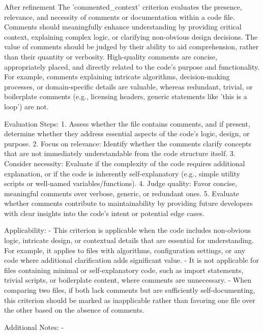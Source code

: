 \begin{tcolorbox}
    [title = {Criterion \textbf{commented\_context}},breakable] After refinement
    \tcblower \footnotesize The 'commented\_context' criterion evaluates the presence,
    relevance, and necessity of comments or documentation within a code file.
    Comments should meaningfully enhance understanding by providing critical
    context, explaining complex logic, or clarifying non-obvious design
    decisions. The value of comments should be judged by their ability to aid comprehension,
    rather than their quantity or verbosity. High-quality comments are concise,
    appropriately placed, and directly related to the code's purpose and functionality.
    For example, comments explaining intricate algorithms, decision-making
    processes, or domain-specific details are valuable, whereas redundant, trivial,
    or boilerplate comments (e.g., licensing headers, generic statements like 'this
    is a loop') are not.\par Evaluation Steps: 1. Assess whether the file
    contains comments, and if present, determine whether they address essential
    aspects of the code's logic, design, or purpose. 2. Focus on relevance:
    Identify whether the comments clarify concepts that are not immediately
    understandable from the code structure itself. 3. Consider necessity:
    Evaluate if the complexity of the code requires additional explanation, or if
    the code is inherently self-explanatory (e.g., simple utility scripts or
    well-named variables/functions). 4. Judge quality: Favor concise, meaningful
    comments over verbose, generic, or redundant ones. 5. Evaluate whether comments
    contribute to maintainability by providing future developers with clear insights
    into the code's intent or potential edge cases.\par Applicability: - This
    criterion is applicable when the code includes non-obvious logic, intricate design,
    or contextual details that are essential for understanding. For example, it
    applies to files with algorithms, configuration settings, or any code where
    additional clarification adds significant value. - It is not applicable for files
    containing minimal or self-explanatory code, such as import statements, trivial
    scripts, or boilerplate content, where comments are unnecessary. - When
    comparing two files, if both lack comments but are sufficiently self-documenting,
    this criterion should be marked as inapplicable rather than favoring one
    file over the other based on the absence of comments.\par Additional Notes: -

\end{tcolorbox}
